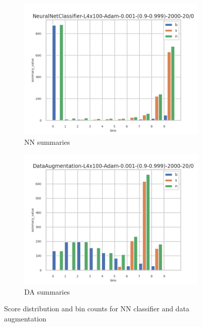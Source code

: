 \begin{figure}[ht!]
  \begin{subfigure}[t]{0.49\linewidth}
    \includegraphics[width=\linewidth]{GG-prior/NN/valid_summaries.png}
    \caption{NN summaries}
  \end{subfigure}%
  \hfill
  \begin{subfigure}[t]{0.49\linewidth}
    \includegraphics[width=\linewidth]{GG-prior/DA/valid_summaries.png}
    \caption{DA summaries}
  \end{subfigure}

  \caption{Score distribution and bin counts for NN classifier and data augmentation}
  \label{fig:gg_prior_distrib_summaries}
\end{figure}



